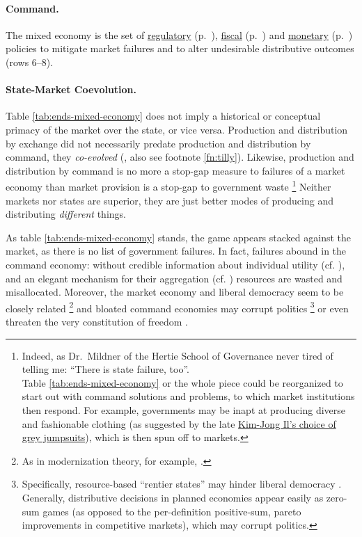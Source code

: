 \paragraph[Command]{Command.}  \label{sec:command} The mixed economy is the set of \hyperref[sec:regulatory]{regulatory} (p.~\pageref{sec:regulatory}), \hyperref[sec:fiscal]{fiscal} (p.~\pageref{sec:fiscal}) and \hyperref[sec:monetary]{monetary} (p.~\pageref{sec:monetary}) policies to mitigate market failures and to alter undesirable distributive outcomes (rows 6--8).

\paragraph{State-Market Coevolution.}
Table \ref{tab:ends-mixed-economy} does not imply a historical or conceptual primacy of the market over the state, or vice versa.
Production and distribution by exchange did not necessarily predate production and distribution by command, they \emph{co-evolved} (\citealt{Tilly-1985-aa}, also see footnote \ref{fn:tilly}).
Likewise, production and distribution by command is no more a stop-gap measure to failures of a market economy than market provision is a stop-gap to government waste
\footnote
	{Indeed, as Dr.~Mildner of the Hertie School of Governance never tired of telling me:
	``There is state failure, too''. \\
	Table \ref{tab:ends-mixed-economy} or the whole piece could be reorganized to start out with command solutions and problems, to which market institutions then respond.
	For example, governments may be inapt at producing diverse and fashionable clothing (as suggested by the late \href{http://kimjongillookingatthings.tumblr.com/}{Kim-Jong Il's choice of grey jumpsuits}), which is then spun off to markets.
}
Neither markets nor states are superior, they are just better modes of producing and distributing \emph{different} things.

As table \ref{tab:ends-mixed-economy} stands, the game appears stacked against the market, as there is no list of government failures.
In fact, failures abound in the command economy:
without credible information about individual utility (cf. \citealt{Hayek1931}), and an elegant mechanism for their aggregation (cf. \citealt{Lerner1944, Lange1934, Debreu1954}) resources are wasted and misallocated.
Moreover, the market economy and liberal democracy seem to be closely related
\footnote{
	As in modernization theory, for example, \cite{InglehartWelzel-2005-aa}.
}
and bloated command economies may corrupt politics
\footnote{
	Specifically, resource-based ``rentier states'' may hinder liberal democracy \citep{Beblawi1990}. Generally, distributive decisions in planned economies appear easily as zero-sum games (as opposed to the per-definition positive-sum, pareto improvements in competitive markets), which may corrupt politics.
}
or even threaten the very constitution of freedom \citep{Hayek1944, Friedman1962}.

